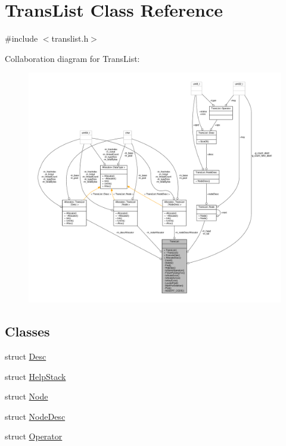 \hypertarget{classTransList}{\section{Trans\-List Class Reference}
\label{classTransList}
}


{\ttfamily \#include $<$translist.\-h$>$}



Collaboration diagram for Trans\-List\-:
\nopagebreak
\begin{figure}[H]
\begin{center}
\leavevmode
\includegraphics[width=350pt]{classTransList__coll__graph}
\end{center}
\end{figure}
\subsection*{Classes}
\begin{DoxyCompactItemize}
\item 
struct \hyperlink{structTransList_1_1Desc}{Desc}
\item 
struct \hyperlink{structTransList_1_1HelpStack}{Help\-Stack}
\item 
struct \hyperlink{structTransList_1_1Node}{Node}
\item 
struct \hyperlink{structTransList_1_1NodeDesc}{Node\-Desc}
\item 
struct \hyperlink{structTransList_1_1Operator}{Operator}
\end{DoxyCompactItemize}
